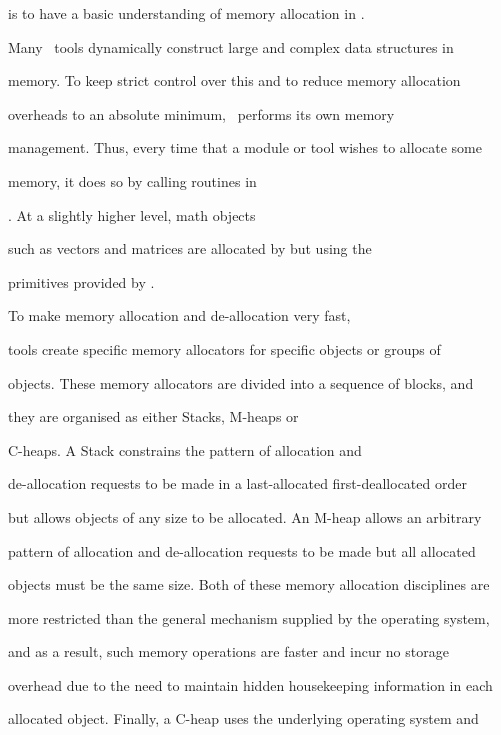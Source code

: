 is to have a basic understanding of memory allocation in \HTK.





Many \HTK\ tools dynamically construct large and complex data structures in


memory.  To keep strict control over this and to reduce memory allocation


overheads to an absolute minimum, \HTK\ performs its own memory


management. Thus, every time that a module or tool wishes to allocate some


memory, it does so by calling routines in


. At a slightly higher level, math objects


such as vectors and matrices are allocated by  but using the


primitives provided by .





To make memory allocation and de-allocation very fast,


tools create specific memory allocators for specific objects or groups of


objects.  These memory allocators are divided into a sequence of blocks, and


they are organised as either Stacks, M-heaps or


C-heaps.  A Stack constrains the pattern of allocation and


de-allocation requests to be made in a last-allocated first-deallocated order


but allows objects of any size to be allocated. An M-heap allows an arbitrary


pattern of allocation and de-allocation requests to be made but all allocated


objects must be the same size.  Both of these memory allocation disciplines are


more restricted than the general mechanism supplied by the operating system,


and as a result, such memory operations are faster and incur no storage


overhead due to the need to maintain hidden housekeeping information in each


allocated object.  Finally, a C-heap uses the underlying operating system and


